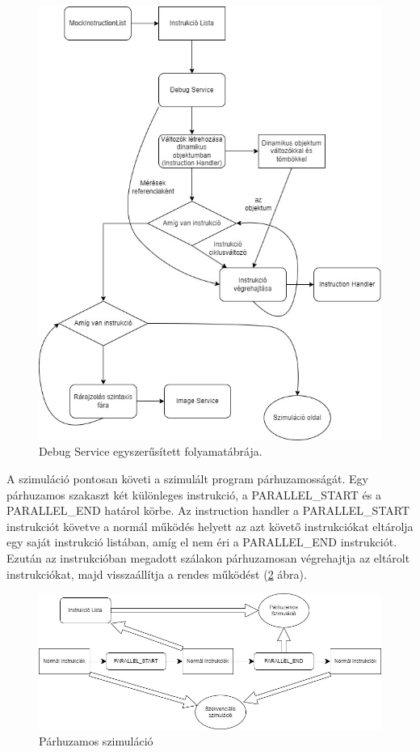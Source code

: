 \begin{figure}[h]
\centering
\includegraphics[scale=0.5]{images/SimpleDebug.jpg}
\caption{Debug Service egyszerűsített folyamatábrája.}
\label{fig:debugflow}
\end{figure}

A szimuláció pontosan követi a szimulált program párhuzamosságát. Egy párhuzamos szakaszt két különleges instrukció, a PARALLEL{\_}START és a PARALLEL{\_}END határol körbe. Az instruction handler a PARALLEL{\_}START instrukciót követve a normál működés helyett az azt követő instrukciókat eltárolja egy saját instrukció listában, amíg el nem éri a PARALLEL{\_}END instrukciót. Ezután az instrukcióban megadott szálakon párhuzamosan végrehajtja az eltárolt instrukciókat, majd visszaállítja a rendes működést (\ref{fig:parallelSim} ábra).


\begin{figure}[h]
\centering
\includegraphics[scale=0.5]{images/Parallel_Simulation.jpg}
\caption{Párhuzamos szimuláció}
\label{fig:parallelSim}
\end{figure}


